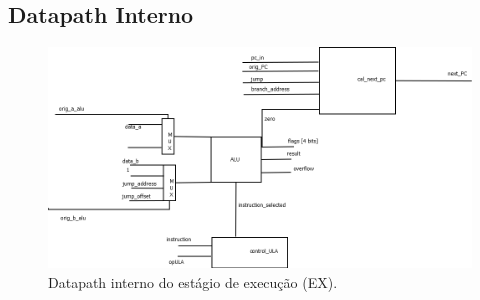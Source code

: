 	\subsection{Datapath Interno}
	
	\begin{figure}[ht]
		\begin{center}
		\includegraphics[scale = 0.5]{./datapath/step3.png}
		\caption*{Datapath interno do estágio de execução (EX).}
		\end{center}
	\end{figure}
